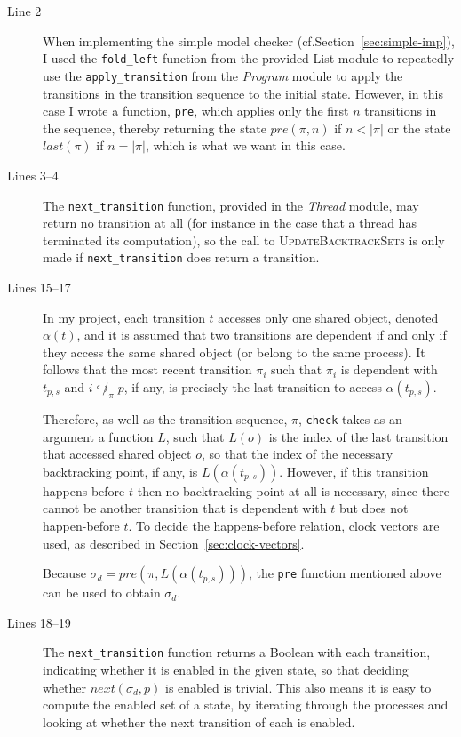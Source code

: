\documentclass[12pt,a4paper,twoside,openright]{report}
\begin{document}
\begin{description}
	\item[Line 2] When implementing the simple
	model checker (cf.\@ Section~\ref{sec:simple-imp}),
	I used the \texttt{fold\_left}
	function from the provided List module to
	repeatedly use the \texttt{apply\_transition}
	from the \textit{Program} module to apply
	the transitions in the transition sequence
	to the initial state. However, in this case
	I wrote a function, \texttt{pre},
	which applies only the first
	$n$ transitions in the sequence,
	thereby returning the state
	$\textit{pre}(\pi, n)$ if $n < |\pi|$
	or the state $\textit{last}(\pi)$ if
	$n = |\pi|$, which is what we want in
	this case.

	\item[Lines 3--4] The \texttt{next\_transition}
	function, provided in the \textit{Thread} module,
	may return no transition at all (for instance
	in the case that a thread has terminated its
	computation), so the call to 
	\textsc{UpdateBacktrackSets} is only made if
	\texttt{next\_transition} does return a
	transition.

	\item[Lines 15--17] In my project,
	each transition $t$ accesses only one shared
	object, denoted $\alpha(t)$,
	and it is assumed that two transitions are
	dependent if and only if they access
	the same shared object (or belong to the
	same process). It follows that the most
	recent transition $\pi_i$ such that
	$\pi_i$ is dependent with $t_{p,s}$
	and $i \not\hookrightarrow_\pi p$,
	if any,
	is precisely the last transition
	to access $\alpha(t_{p,s})$.

	Therefore, as well as the transition
	sequence, $\pi$, \texttt{check} takes
	as an argument 
	a function $L$, such that $L(o)$ is the
	index of the last transition that accessed
	shared object $o$, so that the index of the
	necessary backtracking point, if any, is
	$L(\alpha(t_{p,s}))$. However, if
	this transition happens-before
	$t$ then no backtracking point at all
	is necessary, since there cannot be another
	transition that is dependent with $t$
	but does not happen-before $t$. To
	decide the happens-before relation,
	clock vectors are used, as described 
	in Section~\ref{sec:clock-vectors}.

	Because	$\sigma_d = pre(\pi, L(\alpha(t_{p,s})))$,
	the \texttt{pre} function mentioned above can be
	used to obtain $\sigma_d$.

	\item[Lines 18--19]	The \texttt{next\_transition} function
	returns a Boolean with each transition, indicating whether
	it is enabled in the given state, so that deciding whether
	$\textit{next}(\sigma_d,p)$ is enabled is trivial.
	This also
	means it is easy to compute the enabled
	set of a state, by iterating through the processes
	and looking at whether the next transition of each
	is enabled.


\end{description}
\end{document}
